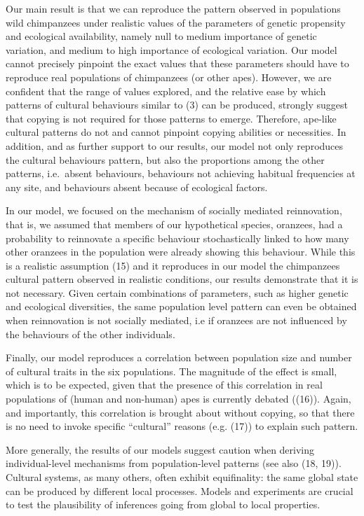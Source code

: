 \documentclass[9pt,twocolumn,twoside,]{pnas-new}
\begin{document}
Our main result is that we can reproduce the pattern observed in
populations wild chimpanzees under realistic values of the parameters of
genetic propensity and ecological availability, namely null to medium
importance of genetic variation, and medium to high importance of
ecological variation. Our model cannot precisely pinpoint the exact
values that these parameters should have to reproduce real populations
of chimpanzees (or other apes). However, we are confident that the range
of values explored, and the relative ease by which patterns of cultural
behaviours similar to (3) can be produced, strongly suggest that copying
is not required for those patterns to emerge. Therefore, ape-like
cultural patterns do not and cannot pinpoint copying abilities or
necessities. In addition, and as further support to our results, our
model not only reproduces the cultural behaviours pattern, but also the
proportions among the other patterns, i.e.~absent behaviours, behaviours
not achieving habitual frequencies at any site, and behaviours absent
because of ecological factors.

In our model, we focused on the mechanism of socially mediated
reinnovation, that is, we assumed that members of our hypothetical
species, oranzees, had a probability to reinnovate a specific behaviour
stochastically linked to how many other oranzees in the population were
already showing this behaviour. While this is a realistic assumption
(15) and it reproduces in our model the chimpanzees cultural pattern
observed in realistic conditions, our results demonstrate that it is not
necessary. Given certain combinations of parameters, such as higher
genetic and ecological diversities, the same population level pattern
can even be obtained when reinnovation is not socially mediated, i.e if
oranzees are not influenced by the behaviours of the other individuals.

Finally, our model reproduces a correlation between population size and
number of cultural traits in the six populations. The magnitude of the
effect is small, which is to be expected, given that the presence of
this correlation in real populations of (human and non-human) apes is
currently debated ((16)). Again, and importantly, this correlation is
brought about without copying, so that there is no need to invoke
specific ``cultural'' reasons (e.g. (17)) to explain such pattern.

More generally, the results of our models suggest caution when deriving
individual-level mechanisms from population-level patterns (see also
(18, 19)). Cultural systems, as many others, often exhibit equifinality:
the same global state can be produced by different local processes.
Models and experiments are crucial to test the plausibility of
inferences going from global to local properties.
\end{document}
